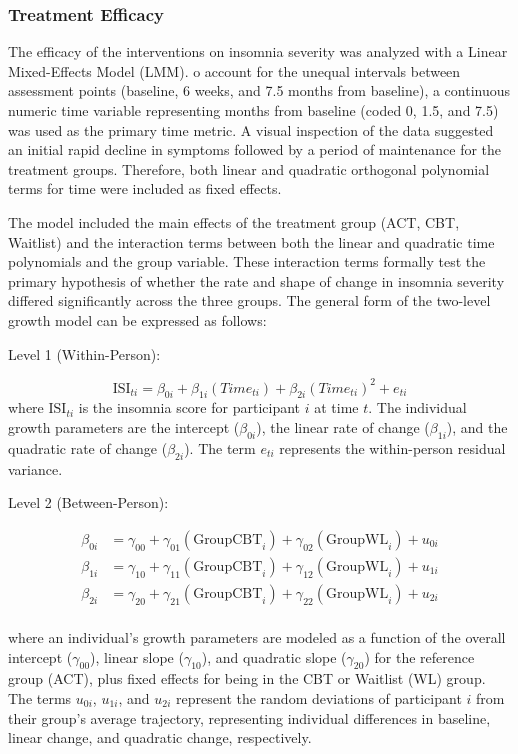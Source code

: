 \documentclass[
  english,
  man]{apa6}
\begin{document}
\subsubsection{Treatment Efficacy}\label{treatment-efficacy}

The efficacy of the interventions on insomnia severity was analyzed with a Linear Mixed-Effects Model (LMM). o account for the unequal intervals between assessment points (baseline, 6 weeks, and 7.5 months from baseline), a continuous numeric time variable representing months from baseline (coded 0, 1.5, and 7.5) was used as the primary time metric. A visual inspection of the data suggested an initial rapid decline in symptoms followed by a period of maintenance for the treatment groups. Therefore, both linear and quadratic orthogonal polynomial terms for time were included as fixed effects.

The model included the main effects of the treatment group (ACT, CBT, Waitlist) and the interaction terms between both the linear and quadratic time polynomials and the group variable. These interaction terms formally test the primary hypothesis of whether the rate and shape of change in insomnia severity differed significantly across the three groups. The general form of the two-level growth model can be expressed as follows:

Level 1 (Within-Person):

\[
\text{ISI}_{ti} = \beta_{0i} + \beta_{1i} (Time_{ti}) + \beta_{2i} (Time_{ti})^2 + e_{ti} 
\]
where \(\text{ISI}_{ti}\) is the insomnia score for participant \(i\) at time \(t\). The individual growth parameters are the intercept (\(\beta_{0i}\)), the linear rate of change (\(\beta_{1i}\)), and the quadratic rate of change (\(\beta_{2i}\)). The term \(e_{ti}\) represents the within-person residual variance.

Level 2 (Between-Person):

\[
\begin{aligned}
  \beta_{0i} &= \gamma_{00} + \gamma_{01}(\text{GroupCBT}_i) + \gamma_{02}(\text{GroupWL}_i) + u_{0i}\\
  \beta_{1i} &= \gamma_{10} + \gamma_{11}(\text{GroupCBT}_i) + \gamma_{12}(\text{GroupWL}_i) + u_{1i}\\
  \beta_{2i} &= \gamma_{20} + \gamma_{21}(\text{GroupCBT}_i) + \gamma_{22}(\text{GroupWL}_i) + u_{2i}\\
\end{aligned}
\]

where an individual's growth parameters are modeled as a function of the overall intercept (\(\gamma_{00}\)), linear slope (\(\gamma_{10}\)), and quadratic slope (\(\gamma_{20}\)) for the reference group (ACT), plus fixed effects for being in the CBT or Waitlist (WL) group. The terms \(u_{0i}\), \(u_{1i}\), and \(u_{2i}\) represent the random deviations of participant \(i\) from their group's average trajectory, representing individual differences in baseline, linear change, and quadratic change, respectively.
\end{document}
